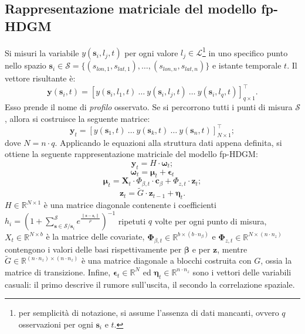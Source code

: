 \subsection[Rappresentazione matriciale del modello fp-HDGM]{Rappresentazione matriciale del modello fp-HDGM}
Si misuri la variabile $y(\mathbf{s}_i, l_j, t)$ per ogni valore $l_j\in \mathcal{L}$\footnote{per semplicità di notazione, si assume l'assenza di dati mancanti, ovvero $q$ osservazioni per ogni $\mathbf{s}_i$ e $t$.} in uno specifico punto nello spazio $\mathbf{s}_i\in\mathcal{S} = \{(s_{lon,1}, s_{lat,1}),\dots,(s_{lon,n}, s_{lat,n})\}$ e istante temporale $t$. Il vettore risultante è:
\[
\mathbf{y}(\mathbf{s}_i, t) = \left[ y(\mathbf{s}_i, l_1, t) \ \dots \ y(\mathbf{s}_i, l_j, t) \ \dots \ y(\mathbf{s}_i, l_q, t) \right]^\top_{q\times 1}.
\]
Esso prende il nome di \textit{profilo} osservato. Se si percorrono tutti i punti di misura $\mathcal{S}$, allora si costruisce la seguente matrice:
\[
\mathbf{y}_t = \left[ {y}(\mathbf{s}_1, t) \ \dots \ {y}(\mathbf{s}_k, t) \ \dots \ {y}(\mathbf{s}_n, t) \right]^\top_{N\times 1};
\]
dove $N=n\cdot q$. Applicando le equazioni alla struttura dati appena definita, si ottiene la seguente rappresentazione matriciale del modello fp-HDGM:
\begin{equation}
	\mathbf{y}_t = H\cdot\boldsymbol{\omega}_t;
	\label{eq_matriciale_y_fp_HDGM}
\end{equation}
\begin{equation}
	\boldsymbol{\omega}_t = \boldsymbol{\mu}_t + \boldsymbol{\epsilon}_t
\end{equation}
\begin{equation}
	\boldsymbol{\mu}_t = \mathbf{X}_t\cdot\Phi_{\beta, t}\cdot\mathbf{c}_\beta + \Phi_{z, t}\cdot\mathbf{z}_t;
\end{equation}
\begin{equation}
	\mathbf{z}_t = \tilde{G}\cdot\mathbf{z}_{t-1} + \boldsymbol{\eta}_t.
	\label{eq_matriciale_z_fp_HDGM}
\end{equation}
$H\in\mathbb{R}^{N\times 1}$ è una matrice diagonale contenente i coefficienti $h_i = \left( 1 + \sum_{\mathbf{s}\in\mathcal{S}/\mathbf{s}_i}^{\mathcal{S}} e^{\frac{\|\mathbf{s} - \mathbf{s}_i\|}{\rho}}\right)^{-1}$ ripetuti $q$ volte per ogni punto di misura, $X_t\in\mathbb{R}^{N\times b}$ è la matrice delle covariate, $\boldsymbol{\Phi}_{\beta, t}\in\mathbb{R}^{b\times (b\cdot n_\beta)}$ e $\boldsymbol{\Phi}_{z, t}\in\mathbb{R}^{N\times(n\cdot n_z)}$ contengono i valori delle basi rispettivamente per $\boldsymbol{\beta}$ e per $\mathbf{z}$, mentre $\tilde{G}\in\mathbb{R}^{(n\cdot n_z)\times (n\cdot n_z)}$ è una matrice diagonale a blocchi costruita con $G$, ossia la matrice di transizione. Infine, $\boldsymbol{\epsilon}_t\in\mathbb{R}^{N}$ ed $\boldsymbol{\eta}_t\in\mathbb{R}^{n\cdot n_z}$ sono i vettori delle variabili casuali: il primo descrive il rumore sull'uscita, il secondo la correlazione spaziale.

